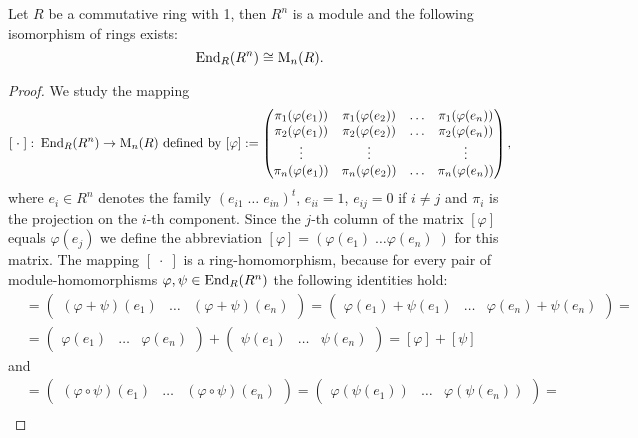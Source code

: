 \begin{pro}\label{prop.Matrix isomorph Homomorphism}
Let $R$ be a commutative ring with 1, then $R^n$ is a module and the following isomorphism of rings exists:
\begin{equation*}
\operatorname{\mathrm{End}}_R(R^n)\cong \mathrm{M}_n(R).
\end{equation*}
\end{pro}
\begin{proof}
We study the mapping 
\begin{equation*}
\left[\;\cdot\;\right]\colon\operatorname{\mathrm{End}}_R(R^n)\to\mathrm{M}_n(R)\text{ defined by }[\varphi]:=
\begin{pmatrix}
\pi_1(\varphi(e_1)) & \pi_1(\varphi(e_2)) & \ldots & \pi_1(\varphi(e_n))\\
\pi_2(\varphi(e_1)) & \pi_2(\varphi(e_2)) & \ldots & \pi_2(\varphi(e_n))\\
\vdots &\vdots & &\vdots\\
\pi_n(\varphi(e_1)) & \pi_n(\varphi(e_2)) & \ldots & \pi_n(\varphi(e_n))
\end{pmatrix},
\end{equation*}
where $e_i\in R^n$ denotes the family $\left(e_{i1}\;\ldots\;e_{in}\right)^t$, $e_{ii}=1$, $e_{ij}=0$ if $i\neq j$ and $\pi_i$ is the projection on the $i$-th component. Since the $j$-th column of the matrix $[\varphi]$ equals $\varphi(e_j)$ we define the abbreviation $[\varphi]=\left(\varphi(e_1)\;\ldots\varphi(e_n)\;\right)$ for this matrix. The mapping $\left[\;\cdot\;\right]$ is a ring-homomorphism, because for every pair of module-homomorphisms $\varphi,\psi\in\operatorname{\mathrm{End}}_R(R^n)$ the following identities hold:
\begin{align*}
[\varphi+\psi]&=\begin{pmatrix}(\varphi+\psi)(e_1) & \dots & (\varphi+\psi)(e_n)\end{pmatrix}=\begin{pmatrix}\varphi(e_1)+\psi(e_1) & \dots & \varphi(e_n)+\psi(e_n)\end{pmatrix}=\\
&=\begin{pmatrix}\varphi(e_1) & \ldots & \varphi(e_n)\end{pmatrix}+\begin{pmatrix}\psi(e_1) & \ldots & \psi(e_n)\end{pmatrix}=[\varphi]+[\psi]
\end{align*}
and
\begin{align*}
[\varphi\circ\psi]&=\begin{pmatrix}(\varphi\circ\psi)(e_1) & \ldots & (\varphi\circ\psi)(e_n)\end{pmatrix}=\begin{pmatrix}\varphi(\psi(e_1)) & \ldots & \varphi(\psi(e_n))\end{pmatrix}=\\

\end{align*}
\end{proof}
